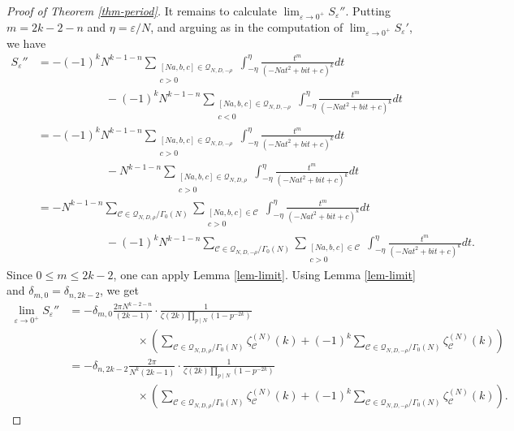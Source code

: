 \documentclass[12pt]{amsart}
\numberwithin{equation}{section}
\theoremstyle{definition}
\begin{document}
\begin{proof}[Proof of Theorem \ref{thm-period}]
It remains to calculate $\lim_{\varepsilon\rightarrow 0^{+}}S_{\varepsilon}''$.
Putting $m=2k-2-n$ and $\eta=\varepsilon/N$, and arguing as in the computation of $\lim_{\varepsilon\rightarrow 0^{+}}S_{\varepsilon}'$, we have
\begin{align*}
    S_{\varepsilon}''&=-(-1)^{k}N^{k-1-n}\sum\limits_{\substack{[Na,b,c]\in\mathcal{Q}_{N,D,-\rho} \\ c>0}}\int_{-\eta}^{\eta}\frac{t^{m}}{(-Nat^{2}+bit+c)^{k}}dt\\
    &\qquad\qquad\qquad-(-1)^{k}N^{k-1-n}\sum\limits_{\substack{[Na,b,c]\in\mathcal{Q}_{N,D,-\rho} \\ c<0}}\int_{-\eta}^{\eta}\frac{t^{m}}{(-Nat^{2}+bit+c)^{k}}dt\\
    &=-(-1)^{k}N^{k-1-n}\sum\limits_{\substack{[Na,b,c]\in\mathcal{Q}_{N,D,-\rho} \\ c>0}}\int_{-\eta}^{\eta}\frac{t^{m}}{(-Nat^{2}+bit+c)^{k}}dt\\
    &\qquad\qquad\qquad-N^{k-1-n}\sum\limits_{\substack{[Na,b,c]\in\mathcal{Q}_{N,D,\rho} \\ c>0}}\int_{-\eta}^{\eta}\frac{t^{m}}{(-Nat^{2}+bit+c)^{k}}dt\\
    &=-N^{k-1-n}\sum_{\mathcal{C}\in\mathcal{Q}_{N,D,\rho}/\Gamma_{0}(N)}\sum\limits_{\substack{[Na,b,c]\in\mathcal{C} \\ c>0}}\int_{-\eta}^{\eta}\frac{t^{m}}{(-Nat^{2}+bit+c)^{k}}dt\\
    &\qquad\qquad\qquad-(-1)^{k}N^{k-1-n}\sum_{\mathcal{C}\in\mathcal{Q}_{N,D,-\rho}/\Gamma_{0}(N)}\sum\limits_{\substack{[Na,b,c]\in\mathcal{C} \\ c>0}}\int_{-\eta}^{\eta}\frac{t^{m}}{(-Nat^{2}+bit+c)^{k}}dt.
\end{align*}
Since $0\leq m\leq 2k-2$, one can apply Lemma \ref{lem-limit}. Using Lemma \ref{lem-limit} and $\delta_{m,0}=\delta_{n,2k-2}$, we get
\begin{align*}
    \lim_{\varepsilon\rightarrow 0^{+}}S_{\varepsilon}''&=-\delta_{m,0}\frac{2\pi N^{k-2-n}}{(2k-1)}\cdot\frac{1}{\zeta(2k)\prod_{p\mid N}(1-p^{-2k})}\\
    &\qquad\qquad\qquad\times\left(\sum_{\mathcal{C}\in\mathcal{Q}_{N,D,\rho}/\Gamma_{0}(N)}\zeta_{\mathcal{C}}^{(N)}(k)+(-1)^{k}\sum_{\mathcal{C}\in\mathcal{Q}_{N,D,-\rho}/\Gamma_{0}(N)}\zeta_{\mathcal{C}}^{(N)}(k)\right)\\
    &=-\delta_{n,2k-2}\frac{2\pi}{N^{k}(2k-1)}\cdot\frac{1}{\zeta(2k)\prod_{p\mid N}(1-p^{-2k})}\\
    &\qquad\qquad\qquad\times\left(\sum_{\mathcal{C}\in\mathcal{Q}_{N,D,\rho}/\Gamma_{0}(N)}\zeta_{\mathcal{C}}^{(N)}(k)+(-1)^{k}\sum_{\mathcal{C}\in\mathcal{Q}_{N,D,-\rho}/\Gamma_{0}(N)}\zeta_{\mathcal{C}}^{(N)}(k)\right).
\end{align*}
\end{proof}
\end{document}
